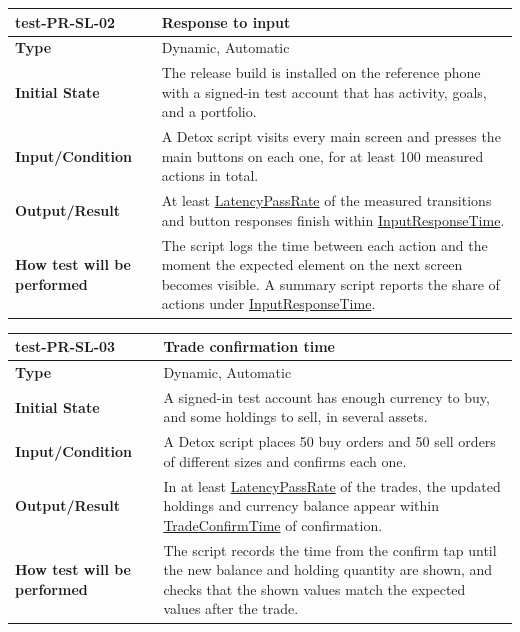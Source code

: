 \documentclass[12pt, titlepage]{article}
\newcommand{\const}[1]{\hyperlink{const:#1}{\textsf{#1}}}
\begin{document}
\noindent\begin{tabularx}{\textwidth}{>{\raggedright\arraybackslash}p{3.5cm}X}
  \toprule
  \textbf{test-PR-SL-02} & \textbf{Response to input}\\
  \midrule
  \textbf{Type} & Dynamic, Automatic\\
  \textbf{Initial State} & The release build is installed on the reference phone with a signed-in test account that has activity, goals, and a portfolio.\\
  \textbf{Input/Condition} & A Detox script visits every main screen and presses the main buttons on each one, for at least 100 measured actions in total.\\
  \textbf{Output/Result} & At least \const{LatencyPassRate} of the measured transitions and button responses finish within \const{InputResponseTime}.\\
  \textbf{How test will be performed} & The script logs the time between each action and the moment the expected element on the next screen becomes visible. A summary script reports the share of actions under \const{InputResponseTime}.\\
  \bottomrule
\end{tabularx}

\vspace{1em}

\noindent\begin{tabularx}{\textwidth}{>{\raggedright\arraybackslash}p{3.5cm}X}
  \toprule
  \textbf{test-PR-SL-03} & \textbf{Trade confirmation time}\\
  \midrule
  \textbf{Type} & Dynamic, Automatic\\
  \textbf{Initial State} & A signed-in test account has enough currency to buy, and some holdings to sell, in several assets.\\
  \textbf{Input/Condition} & A Detox script places 50 buy orders and 50 sell orders of different sizes and confirms each one.\\
  \textbf{Output/Result} & In at least \const{LatencyPassRate} of the trades, the updated holdings and currency balance appear within \const{TradeConfirmTime} of confirmation.\\
  \textbf{How test will be performed} & The script records the time from the confirm tap until the new balance and holding quantity are shown, and checks that the shown values match the expected values after the trade.\\
  \bottomrule
\end{tabularx}
\end{document}
